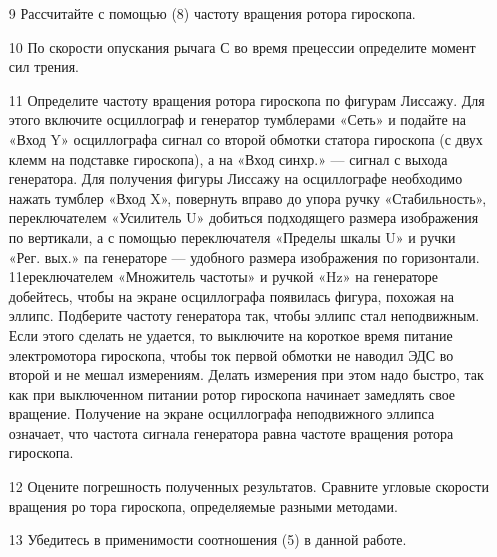 \documentclass[a4paper,12pt]{article} %
\begin{document}
\begin{itemize}
\item[9] 	Рассчитайте с помощью (8) частоту вращения ротора гироскопа. 
\item[10] По скорости опускания рычага $\text{С}$ во время прецессии определите момент сил трения.
\item[11] 	Определите частоту вращения ротора гироскопа по фигурам Лиссажу. Для этого включите осциллограф и генератор тумблерами «Сеть» и подайте на «Вход Y» осциллографа сигнал со второй обмотки статора гироскопа (с двух клемм на подставке гироскопа), а на «Вход синхр.» — сигнал с выхода генератора. Для получения фигуры Лиссажу на осциллографе необходимо нажать тумблер «Вход X», повернуть вправо до упора ручку «Стабильность», переключателем «Усилитель U» добиться подходящего размера изображения по вертикали, а с помощью переключателя «Пределы шкалы U» и ручки «Рег. вых.» па генераторе — удобного размера изображения по горизонтали. 11ереключателем «Множитель частоты» и ручкой «Hz» на генераторе добейтесь, чтобы на экране осциллографа появилась фигура, похожая на эллипс. Подберите частоту генератора так, чтобы эллипс стал неподвижным. Если этого сделать не удается, то выключите на короткое время питание электромотора гироскопа, чтобы ток первой обмотки не наводил ЭДС во второй и не мешал измерениям. Делать измерения при этом надо быстро, так как при выключенном питании ротор гироскопа начинает замедлять свое вращение. Получение на экране осциллографа неподвижного эллипса означает, что частота сигнала генератора равна частоте вращения ротора гироскопа.
\item[12] 	Оцените погрешность полученных результатов. Сравните угловые скорости вращения ро тора гироскопа, определяемые разными методами.
\item[13] Убедитесь в применимости соотношения (5) в данной работе.

\end{itemize}
\end{document}
